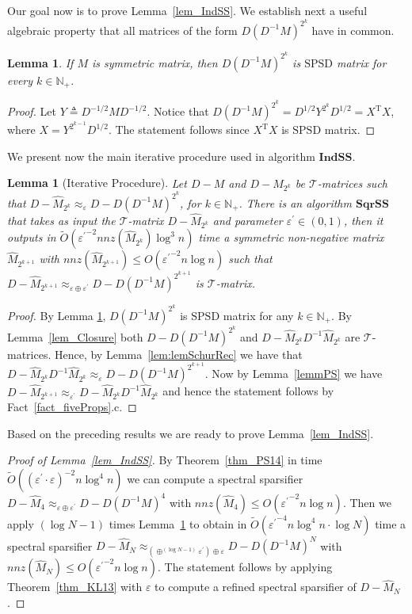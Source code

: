 \documentclass[11pt]{article}
\newcommand{\SPSD}{\mathrm{SPSD}}
\newcommand{\GL}{\mathcal{T}}
\newcommand{\SqrSS}{\mathrm{\mathbf{SqrSS}}}
\newcommand{\IndSS}{\mathrm{\mathbf{IndSS}}}
\newcommand{\wO}{\widetilde{O}}
\newcommand{\hM}{\widehat{M}}
\newcommand{\Di}{D^{-1}}
\newcommand{\Dhm}{D^{-1/2}}
\newcommand{\prm}{\prime}
\newcommand{\N}{\mathbb{N}}
\newcommand{\rot}{\mathrm{T}}
\newcommand{\eps}{\epsilon}
\renewcommand{\leq}{\leqslant}
\newcommand{\lemref}[1]{Lemma~\ref{lem:#1}}
\renewcommand{\eps}{\varepsilon}
\newtheorem{lem}[thm]{Lemma}
\numberwithin{thm}{section}
\begin{document}
Our goal now is to prove Lemma~\ref{lem_IndSS}. We establish next a useful algebraic property that all matrices of the form $D(\Di M)^{2^{k}}$ have in common.

\begin{lem}\label{lem_DM_2k}
If $M$ is symmetric matrix, then $D(\Di M)^{2^{k}}$
is $\SPSD$ matrix for every $k\in\N_{+}$.
\end{lem}

\begin{proof}
Let $Y\triangleq\Dhm M \Dhm$. Notice that $D(\Di M)^{2^{k}}=D^{1/2}Y^{2^{k}}D^{1/2}=X^{\rot}X$,
where $X=Y^{2^{k-1}}D^{1/2}$. The statement follows since $X^{\rot}X$
is $\SPSD$ matrix.
\end{proof}

We present now the main iterative procedure used in algorithm $\IndSS$.

\begin{lem}[Iterative Procedure]\label{lem_SqrSSREC}
Let $D-M$ and $D-\hM_{2^{k}}$ be $\GL$-matrices such that $D-\hM_{2^{k}}\approx_{\eps}D-D(\Di M)^{2^{k}}$, for $k\in\N_+$. There is an algorithm $\SqrSS$
that takes as input the $\GL$-matrix $D-\hM_{2^{k}}$
and parameter $\eps^{\prm}\in(0,1)$, then it outputs in $\wO({\eps^{\prm}}^{-2}nnz(\hM_{2^{k}})\log^{3}n)$
time a symmetric non-negative matrix $\hM_{2^{k+1}}$ with
$nnz(\hM_{2^{k+1}})\leq O({\eps^{\prm}}^{-2}n\log n)$
such that $D-\hM_{2^{k+1}}\approx_{\eps\oplus\eps^{\prm}}D-D(\Di M)^{2^{k+1}}$ is $\GL$-matrix.
\end{lem}

\begin{proof}
By Lemma \ref{lem_DM_2k}, $D(\Di M)^{2^{k}}$ is $\SPSD$
matrix for any $k\in\N_{+}$. By Lemma~\ref{lem_Closure} both $D-D(\Di M)^{2^{k}}$ and $D-\hM_{2^{k}}\Di \hM_{2^{k}}$
are $\GL$-matrices. Hence, by \lemref{lemSchurRec}
we have that $D-\hM_{2^{k}}\Di \hM_{2^{k}}\approx_{\eps}D-D(\Di M)^{2^{k+1}}$. Now by Lemma~\ref{lemmPS} we have $D-\hM_{2^{k+1}}\approx_{\eps^{\prm}}D-\hM_{2^{k}}\Di \hM_{2^{k}}$ and hence the statement follows by Fact~\ref{fact_fiveProps}.c.
\end{proof}

Based on the preceding results we are ready to prove Lemma~\ref{lem_IndSS}.

\begin{proof}[Proof of Lemma~\ref{lem_IndSS}]
By Theorem~\ref{thm_PS14} in time $\wO((\eps^{\prm}\cdot\eps)^{-2}n\log^{4}n)$ we can compute a spectral sparsifier $D-\hM_4\approx_{\eps\oplus\eps^{\prm}}D-D(\Di M)^4$ with $nnz(\hM_4)\leq O({\eps^{\prm}}^{-2}n\log n)$. Then we apply $(\log N - 1)$ times Lemma~\ref{lem_SqrSSREC} to obtain in $\wO({\eps^{\prm}}^{-4}n\log^{4}n\cdot\log N)$ time a spectral sparsifier $D-\hM_N\approx_{(\oplus^{(\log N - 1)}\eps^{\prm})\oplus\eps}D-D(\Di M)^N$ with $nnz(\hM_N)\leq O({\eps^{\prm}}^{-2}n\log n)$. The statement follows by applying Theorem~\ref{thm_KL13} with $\eps$ to compute a refined spectral sparsifier of $D-\hM_N$.
\end{proof}
\end{document}
